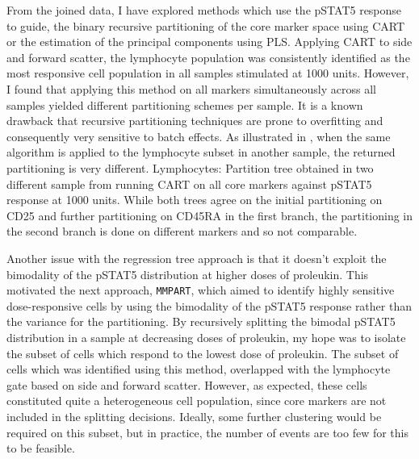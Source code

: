 From the joined data, I have explored methods which use the pSTAT5 response to guide, the binary recursive partitioning of the core marker space using \gls{CART} or the estimation of the principal components using \gls{PLS}.
Applying \gls{CART} to side and forward scatter, the lymphocyte population was consistently identified as the most responsive cell population in all samples stimulated at 1000 units.
However, I found that applying this method on all markers simultaneously across all samples yielded different partitioning schemes per sample.
It is a known drawback that recursive partitioning techniques are prone to overfitting and consequently very sensitive to batch effects.
As illustrated in , when the same algorithm is applied to the lymphocyte subset in another sample, the returned partitioning is very different.
{ Lymphocytes: Partition tree obtained in two different sample from running CART on all core markers against pSTAT5 response at 1000 units. }
{
  While both trees agree on the initial partitioning on CD25 and further partitioning on CD45RA in the first branch,
  the partitioning in the second branch is done on different markers and so not comparable.
} 


Another issue with the regression tree approach is that it doesn't exploit the bimodality of the pSTAT5 distribution at higher doses of proleukin.
This motivated the next approach, \texttt{MMPART}, which aimed to identify highly sensitive dose-responsive cells by using the bimodality of the pSTAT5 response rather than the variance for the partitioning.
By recursively splitting the bimodal pSTAT5 distribution in a sample at decreasing doses of proleukin, my hope was to isolate the subset of cells which respond to the lowest dose of proleukin.
The subset of cells which was identified using this method, overlapped with the lymphocyte gate based on side and forward scatter.
However, as expected, these cells constituted quite a heterogeneous cell population, since core markers are not included in the splitting decisions.
Ideally, some further clustering would be required on this subset, but in practice, the number of events are too few for this to be feasible.

